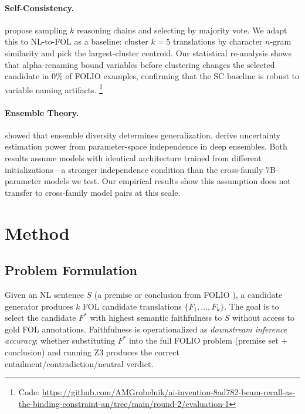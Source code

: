 \documentclass[11pt,letterpaper]{article}
\begin{document}
\paragraph{Self-Consistency.}
\citet{Wang2023} propose sampling $k$ reasoning chains and selecting by majority vote. We adapt this to NL-to-FOL as a baseline: cluster $k{=}5$ translations by character $n$-gram similarity and pick the largest-cluster centroid. Our statistical re-analysis shows that alpha-renaming bound variables before clustering changes the selected candidate in 0\% of FOLIO examples, confirming that the SC baseline is robust to variable naming artifacts.%
\footnote{Code: \url{https://github.com/AMGrobelnik/ai-invention-8ad782-beam-recall-as-the-binding-constraint-an/tree/main/round-2/evaluation-1}}

\paragraph{Ensemble Theory.}
\citet{Breiman2001} showed that ensemble diversity determines generalization. \citet{Lakshminarayanan2017} derive uncertainty estimation power from parameter-space independence in deep ensembles. Both results assume models with identical architecture trained from different initializations---a stronger independence condition than the cross-family 7B-parameter models we test. Our empirical results show this assumption does not transfer to cross-family model pairs at this scale.

\section{Method}
\label{sec:method}

\subsection{Problem Formulation}

Given an NL sentence $S$ (a premise or conclusion from FOLIO \citep{Han2022}), a candidate generator produces $k$ FOL candidate translations $\{F_1, \ldots, F_k\}$. The goal is to select the candidate $F^*$ with highest semantic faithfulness to $S$ without access to gold FOL annotations. Faithfulness is operationalized as \emph{downstream inference accuracy}: whether substituting $F^*$ into the full FOLIO problem (premise set + conclusion) and running Z3 \citep{deMoura2008} produces the correct entailment/contradiction/neutral verdict.
\end{document}
